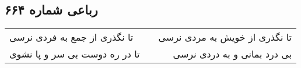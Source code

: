 \begin{center}
\section*{رباعی شماره ۶۶۴}
\label{sec:sh664}
\begin{longtable}{l p{0.5cm} r}
تا نگذری از جمع به فردی نرسی
&&
تا نگذری از خویش به مردی نرسی
\\
تا در ره دوست بی سر و پا نشوی
&&
بی درد بمانی و به دردی نرسی
\\
\end{longtable}
\end{center}
